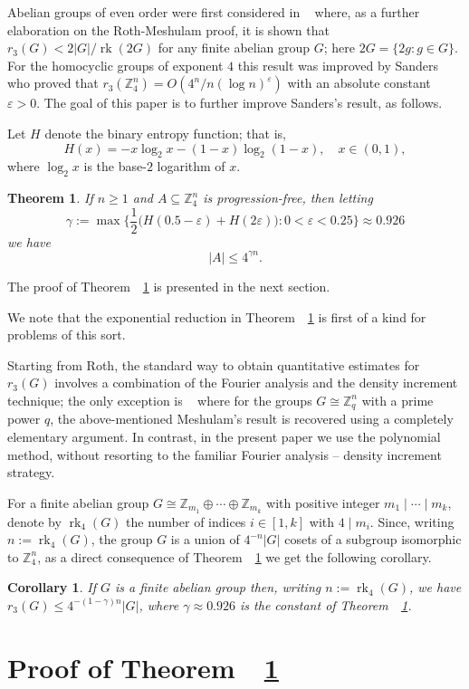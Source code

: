 \documentclass[12pt,reqno]{amsart}
\newcommand{\eps}{\varepsilon}
\newcommand{\gam}{\gamma}
\newcommand{\Z}{{\mathbb Z}}
\newcommand{\<}{\langle}
\renewcommand{\>}{\rangle}
\newcommand{\seq}{\subseteq}
\DeclareMathOperator{\rk}{rk}
\newtheorem{theorem}{Theorem}
\newtheorem{corollary}{Corollary}
\newcommand{\reft}[1]{~\ref{t:#1}}
\newcommand{\refb}[1]{~\cite{b:#1}}
\theoremstyle{remark}
\begin{document}
Abelian groups of even order were first considered in \refb{l1} where, as a
further elaboration on the Roth-Meshulam proof, it is shown that
$r_3(G)<2|G|/\rk(2G)$ for any finite abelian group $G$; here $2G=\{2g\colon
g\in G\}$. For the homocyclic groups of exponent $4$ this result was improved
by Sanders~\refb{s3} who proved that $r_3(\Z_4^n)=O(4^n/n(\log n)^\eps)$ with
an absolute constant $\eps>0$. The goal of this paper is to further improve
Sanders's result, as follows.

Let $H$ denote the binary entropy function; that is,
  $$ H(x) = -x\log_2x - (1-x)\log_2(1-x),\quad x\in(0,1), $$
where $\log_2x$ is the base-$2$ logarithm of $x$.
\begin{theorem}\label{t:main}
If $n\ge 1$ and $A\seq\Z_4^n$ is progression-free, then letting
  $$ \gam := \max \Big\{ \frac12 \big( H(0.5-\eps)+H(2\eps) \big)
                                  \colon 0<\eps<0.25 \Big\} \approx 0.926 $$
we have
  $$ |A| \le 4^{\gam n}. $$
\end{theorem}
The proof of Theorem~\reft{main} is presented in the next section.

We note that the exponential reduction in Theorem~\reft{main} is first of a
kind for problems of this sort.

Starting from Roth, the standard way to obtain quantitative estimates for
$r_3(G)$ involves a combination of the Fourier analysis and the density
increment technique; the only exception is \refb{l2} where for the groups
$G\cong\Z_q^n$ with a prime power $q$, the above-mentioned Meshulam's result
is recovered using a completely elementary argument. In contrast, in the
present paper we use the polynomial method, without resorting to the familiar
Fourier analysis -- density increment strategy.

For a finite abelian group $G\cong\Z_{m_1}\oplus\dotsb\oplus\Z_{m_k}$ with
positive integer $m_1\mid\dotsb\mid m_k$, denote by $\rk_4(G)$ the number of
indices $i\in[1,k]$ with $4\mid m_i$. Since, writing $n:=\rk_4(G)$, the group
$G$ is a union of $4^{-n}|G|$ cosets of a subgroup isomorphic to $\Z_4^n$, as
a direct consequence of Theorem~\reft{main} we get the following corollary.
\begin{corollary}
If $G$ is a finite abelian group then, writing $n:=\rk_4(G)$, we have
$r_3(G)\le 4^{-(1-\gam)n}|G|$, where $\gam\approx 0.926$ is the constant of
Theorem~\reft{main}.
\end{corollary}

\section{Proof of Theorem~\reft{main}}\label{s:proof}
\end{document}
